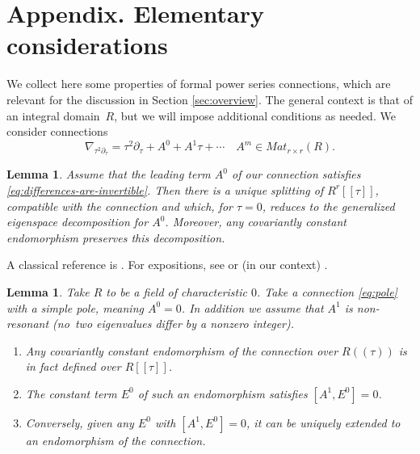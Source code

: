 \documentclass[JEP,XML,SOM,Unicode,NoFloatCountersInSection,published]{cedram}
\newcommand{\llbracket}{[\![}
\newcommand{\rrbracket}{]\!]}
\theoremstyle{plain}
\newtheorem{lemma}[theorem]{Lemma}
\theoremstyle{definition}
\begin{document}
\appendix
\section*{Appendix. Elementary considerations\label{sec:appendix}}
We collect here some properties of formal power series connections, which are relevant for the discussion in Section \ref{sec:overview}. The general context is that of an integral domain~$R$, but we will impose additional conditions as needed. We consider connections
\begin{equation}\label{eq:pole}
\nabla_{\tau^2\partial_\tau} = \tau^2\partial_\tau + A^0 + A^1\tau + \cdots
\quad A^m \in \mathit{Mat}_{r \times r}(R).
\end{equation}

\begin{lemma} \label{th:splitting-lemma}
Assume that the leading term $A^0$ of our connection satisfies \eqref{eq:differences-are-invertible}.
Then there is a unique splitting of $R^r\llbracket \tau\rrbracket$, compatible with the connection and which, for $\tau = 0$, reduces to the generalized eigenspace decomposition for $A^0$. Moreover, any covariantly constant endomorphism preserves this decomposition.
\end{lemma}

A classical reference is \cite[Chap.\,IV, Th.\,11.1]{wasow65}. For expositions, see \cite[\S 6.1]{hugtenburg24} or (in our context) \cite[Cor.\,2.4]{chen24c}.

\begin{lemma} \label{th:non-resonant}
Take $R$ to be a field of characteristic $0$. Take a connection \eqref{eq:pole} with a simple pole, meaning $A^0 = 0$. In addition we assume that $A^1$ is non-resonant (no~two eigenvalues differ by a nonzero integer).

\begin{enumerate}
\item
Any covariantly constant endomorphism of the connection over $R((\tau))$ is in fact defined over $R\llbracket \tau\rrbracket$.

\item
The constant term $E^0$ of such an endomorphism satisfies $[A^1,E^0] = 0$.

\item
Conversely, given any $E^0$ with $[A^1,E^0] = 0$, it can be uniquely extended to an endomorphism of the connection.
\end{enumerate}
\end{lemma}
\end{document}
